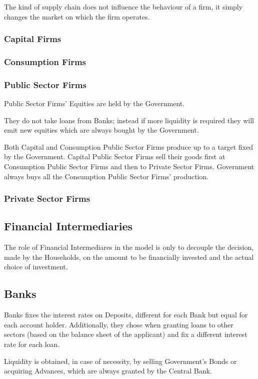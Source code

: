 \documentclass[a4paper, headings=standardclasses]{scrartcl}
\begin{document}
The kind of supply chain does not influence the behaviour of a firm, it simply changes the market on which the firm operates.

\subsubsection{Capital Firms}

\subsubsection{Consumption Firms}

\subsubsection{Public Sector Firms}
Public Sector Firms' Equities are held by the Government. 

They do not take loans from Banks; instead if more liquidity is required they will emit new equities which are always bought by the Government.

Both Capital and Consumption Public Sector Firms produce up to a target fixed by the Government. 
Capital Public Sector Firms sell their goods first at Consumption Public Sector Firms and then to Private Sector Firms.
Government always buys all the Consumption Public Sector Firms' production.

\subsubsection{Private Sector Firms}


\subsection{Financial Intermediaries}
The role of Financial Intermediares in the model is only to decouple the decision, made by the Households, on the amount to be financially invested and the actual choice of investment.

\subsection{Banks}
Banks fixes the interest rates on Deposits, different for each Bank but equal for each account holder.
Additionally, they chose when granting loans to other sectors (based on the balance sheet of the applicant) and fix a different interest rate for each loan.

Liquidity is obtained, in case of necessity, by selling Government's Bonds or acquiring Advances, which are always granted by the Central Bank.
\end{document}
